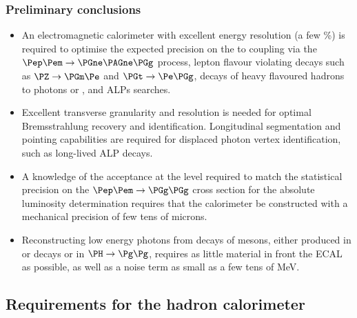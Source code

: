 \subsubsection{Preliminary conclusions}

\begin{itemize}

\item An electromagnetic calorimeter with excellent energy resolution (a few \%) is required to optimise the expected precision on the \PZ to \PGne coupling 
via the $\epem \to \PGne \PAGne \PGg$ process, 
lepton flavour violating decays such as $\PZ  \to \PGm \Pe$ and $\PGt \to \Pe \PGg$, 
decays of heavy flavoured hadrons to photons or \PGpz, 
and ALPs searches. 

\item Excellent transverse granularity and resolution is needed for optimal Bremsstrahlung recovery and \PGpz identification. 
Longitudinal segmentation and pointing capabilities are required for displaced photon vertex identification, such as long-lived ALP decays. 

\item A knowledge of the acceptance at the level required to match the statistical precision on the $\epem \to \PGg \PGg$ cross section 
for the absolute luminosity determination requires that the calorimeter be constructed with a mechanical precision of few tens of microns. 

\item Reconstructing low energy photons from decays of \PGpz mesons, either produced in \PB or \PD decays or in $\PH \to \Pg\Pg$,
requires as little material in front the ECAL as possible, as well as a noise term as small as a few tens of MeV. 

\end{itemize}

\subsection{Requirements for the hadron calorimeter}
\label{sec:PhysPerf_HadCal}

